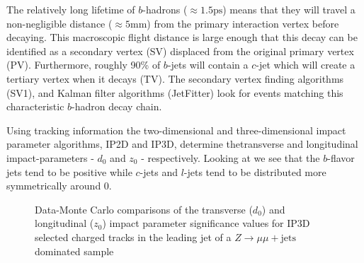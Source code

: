 The relatively long lifetime of $b$-hadrons ($\approx 1.5\text{ps}$) means that
they will travel a non-negligible distance ($\approx 5\text{mm}$) from the primary
interaction vertex before decaying.  This macroscopic flight distance is large
enough that this decay can be identified as a secondary vertex (SV) displaced
from the original primary vertex (PV). Furthermore, roughly 90\% of $b$-jets
will contain a $c$-jet which will create a tertiary vertex when it decays (TV).
The secondary vertex finding algorithms (SV1), and Kalman filter algorithms
(JetFitter) look for events matching this characteristic $b$-hadron decay
chain. 

Using tracking information the two-dimensional and three-dimensional impact
parameter algorithms, IP2D and IP3D, determine thetransverse and longitudinal
impact-parameters - $d_{\text{0}}$ and $z_{\text{0}}$ - respectively. Looking at
 we see that the $b$-flavor jets tend to be
positive while $c$-jets and $l$-jets tend to be distributed more symmetrically
around 0.

\begin{figure}[!htbp]
  \centering
   \hfill

  \caption{\cite{ATL-PHYS-PUB-2017-013} Data-Monte Carlo comparisons of the
transverse ($d_{0}$) and longitudinal ($z_{0}$) impact parameter significance
values for IP3D selected charged tracks in the leading jet of a $Z\to\mu\mu +
\text{jets}$ dominated sample}
  \label{sec:objects:impact_parameters}
\end{figure}

